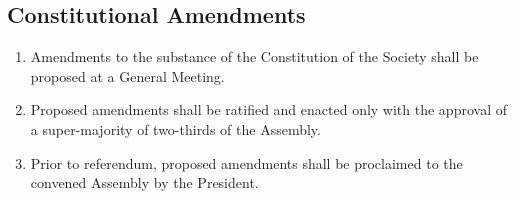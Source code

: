 \documentclass{scrartcl}
\begin{document}
        \subsection{Constitutional Amendments}
            \label{gm--consitutional-amendment}
            \begin{enumerate}
                \item Amendments to the substance of the Constitution of the Society shall be proposed at a General Meeting.
                \item Proposed amendments shall be ratified and enacted only with the approval of a super-majority of two-thirds of the Assembly.
                \item Prior to referendum, proposed amendments shall be proclaimed to the convened Assembly by the President.
            \end{enumerate}
\end{document}
